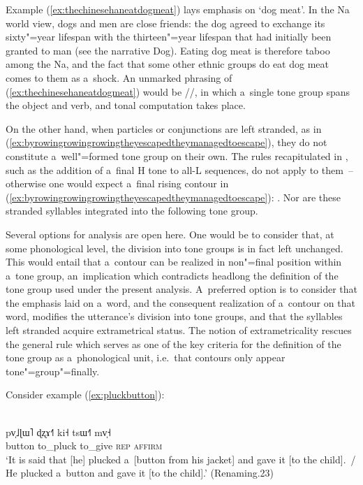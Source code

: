 Example (\ref{ex:thechinesehaneatdogmeat}) lays emphasis on ‘dog meat’. In the Na world view, dogs
and men are close friends: the dog agreed to exchange its sixty"=year lifespan with the thirteen"=year
lifespan that had initially been granted to man (see the narrative Dog). Eating dog meat is
therefore taboo among the Na, and the fact that some other ethnic groups do eat dog meat comes to
them as a~shock. An unmarked {phrasing} of (\ref{ex:thechinesehaneatdogmeat}) would be //, in which a~single tone group spans the object and verb, and tonal
computation takes place.

On the other hand, when particles or conjunctions are left stranded, as in
(\ref{ex:byrowingrowingrowingtheyescapedtheymanagedtoescape}), they do not constitute a~well"=formed tone group
on their own. The rules recapitulated in , such as the addition of a~final H tone to all-L
sequences, do not apply to them~-- otherwise one would expect a~final rising contour in (\ref{ex:byrowingrowingrowingtheyescapedtheymanagedtoescape}):
. Nor are these stranded syllables integrated into the following
tone group.

Several options for analysis are open here. One would be to consider that, at some
phonological level, the division into tone groups is in fact left unchanged. This would entail that
a~contour can be realized in non"=final position within a~tone group, an~implication which contradicts headlong the definition of the tone group used under the present analysis. A~preferred option is to consider that the emphasis laid on a~word,
and the consequent realization of a~contour on that word, modifies the utterance’s division into
tone groups, and that the syllables left stranded acquire extrametrical status. The notion of
extrametricality rescues the general rule which serves as one of the key criteria for the
definition of the tone group as a~phonological unit, i.e.\ that contours only appear
tone"=group"=finally. 

Consider example (\ref{ex:pluckbutton}):
\begin{exe}
  \ex
  \label{ex:pluckbutton}
  \\
  \gll pv̩˩ɭɯ˥	ɖʐɤ˧˥		ki˧		tsɯ˧˥	mv̩˧\\
  button	to\_pluck	to\_give		\textsc{rep}	\textsc{affirm}\\
  \glt ‘It is said that [he] plucked a~[button from his jacket] and gave it [to the child].~/ He
  plucked a~button and gave it [to the child].’ (Renaming.23)
\end{exe}

